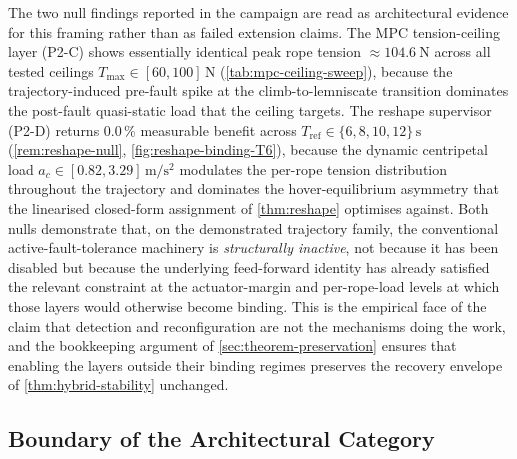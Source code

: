 The two null findings reported in the campaign are read as architectural evidence for this framing rather than as failed extension claims. The MPC tension-ceiling layer (P2-C) shows essentially identical peak rope tension $\approx \SI{104.6}{\newton}$ across all tested ceilings $T_{\max}\in[60,100]\,\si{\newton}$ (\cref{tab:mpc-ceiling-sweep}), because the trajectory-induced pre-fault spike at the climb-to-lemniscate transition dominates the post-fault quasi-static load that the ceiling targets. The reshape supervisor (P2-D) returns $0.0\,\%$ measurable benefit across $T_{\mathrm{ref}}\in\{6,8,10,12\}\,\si{\second}$ (\cref{rem:reshape-null}, \cref{fig:reshape-binding-T6}), because the dynamic centripetal load $a_c\in[0.82,3.29]\,\si{\metre\per\second\squared}$ modulates the per-rope tension distribution throughout the trajectory and dominates the hover-equilibrium asymmetry that the linearised closed-form assignment of \cref{thm:reshape} optimises against. Both nulls demonstrate that, on the demonstrated trajectory family, the conventional active-fault-tolerance machinery is \emph{structurally inactive}, not because it has been disabled but because the underlying feed-forward identity has already satisfied the relevant constraint at the actuator-margin and per-rope-load levels at which those layers would otherwise become binding. This is the empirical face of the claim that detection and reconfiguration are not the mechanisms doing the work, and the bookkeeping argument of \cref{sec:theorem-preservation} ensures that enabling the layers outside their binding regimes preserves the recovery envelope of \cref{thm:hybrid-stability} unchanged.

\subsection{Boundary of the Architectural Category}
\label{sec:discussion-boundary}

